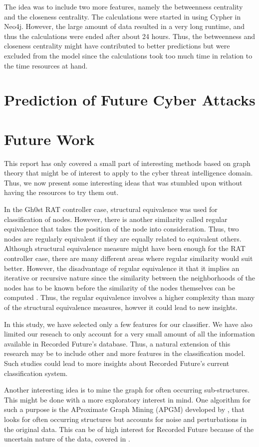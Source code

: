 The idea was to include two more features, namely the betweenness centrality and the closeness centrality. The calculations were started in using Cypher in Neo4j. However, the large amount of data resulted in a very long runtime, and thus the calculations were ended after about 24 hours. Thus, the betweenness and closeness centrality might have contributed to better predictions but were excluded from the model since the calculations took too much time in relation to the time resources at hand. 

\section{Prediction of Future Cyber Attacks}


\section{Future Work}
This report has only covered a small part of interesting methods based on graph theory that might be of interest to apply to the cyber threat intelligence domain. Thus, we now present some interesting ideas that was stumbled upon without having the resources to try them out. 

In the Gh0st RAT controller case, structural equivalence was used for classification of nodes. However, there is another similarity called regular equivalence that takes the position of the node into consideration. Thus, two nodes are regularly equivalent if they are equally related to equivalent others. Although structural equivalence measure might have been enough for the RAT controller case, there are many different areas where regular similarity would suit better. However, the disadvantage of regular equivalence it that it implies an iterative or recursive nature since the similarity between the neighborhoods of the nodes has to be known before the similarity of the nodes themselves can be computed \cite{leicht2006}. Thus, the regular equivalence involves a higher complexity than many of the structural equivalence measures, howver it could lead to new insights. 

In this study, we have selected only a few features for our classifier. We have also limited our reseach to only account for a very small amount of all the information available in Recorded Future's database. Thus, a natural extension of this research may be to include other and more features in the classification model. Such studies could lead to more insights about Recorded Future's current classification system.

Another interesting idea is to mine the graph for often occurring sub-structures. This might be done with a more exploratory interest in mind. One algorithm for such a purpose is the AProximate Graph Mining (APGM) developed by \citet{Jia2011}, that looks for often occurring structures but accounts for noise and perturbations in the original data. This can be of high interest for Recorded Future because of the uncertain nature of the data, covered in .
